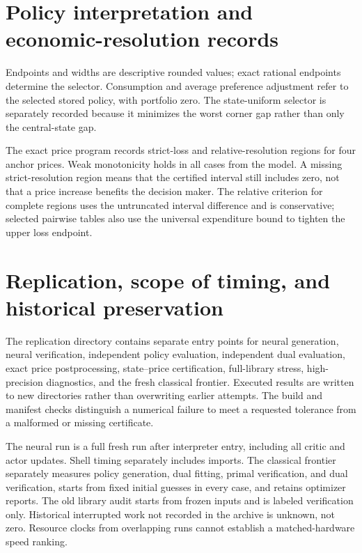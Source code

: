 \section{Policy interpretation and economic-resolution records}
\begin{table}[ht]\centering\small
\caption{Central-state selected policy regions and control summaries}

\par\smallskip\footnotesize Endpoints and widths are descriptive rounded values; exact rational endpoints determine the selector. Consumption and average preference adjustment refer to the selected stored policy, with portfolio zero. The state-uniform selector is separately recorded because it minimizes the worst corner gap rather than only the central-state gap.
\end{table}

The exact price program records strict-loss and relative-resolution regions for four anchor prices. Weak monotonicity holds in all cases from the model. A missing strict-resolution region means that the certified interval still includes zero, not that a price increase benefits the decision maker. The relative criterion for complete regions uses the untruncated interval difference and is conservative; selected pairwise tables also use the universal expenditure bound to tighten the upper loss endpoint.

\section{Replication, scope of timing, and historical preservation}\label{supp:replication}
The replication directory contains separate entry points for neural generation, neural verification, independent policy evaluation, independent dual evaluation, exact price postprocessing, state--price certification, full-library stress, high-precision diagnostics, and the fresh classical frontier. Executed results are written to new directories rather than overwriting earlier attempts. The build and manifest checks distinguish a numerical failure to meet a requested tolerance from a malformed or missing certificate.

The neural run is a full fresh run after interpreter entry, including all critic and actor updates. Shell timing separately includes imports. The classical frontier separately measures policy generation, dual fitting, primal verification, and dual verification, starts from fixed initial guesses in every case, and retains optimizer reports. The old library audit starts from frozen inputs and is labeled verification only. Historical interrupted work not recorded in the archive is unknown, not zero. Resource clocks from overlapping runs cannot establish a matched-hardware speed ranking.

